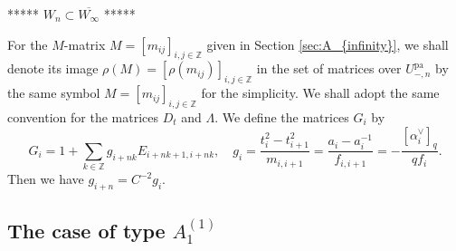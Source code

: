 \documentclass[12pt,twoside]{article}
\newcommand\av{\alpha^\vee}
\newcommand\pa{{\mathrm{pa}}}
\newcommand\Z{{\mathbb Z}} %
\theoremstyle{plain} %
\theoremstyle{definition} %
\theoremstyle{definition} %
\numberwithin{theorem}{section}
\numberwithin{equation}{section}
\numberwithin{figure}{section}
\numberwithin{table}{section}
\newcommand\secref[1]{Section \ref{#1}}
\begin{document}
***** $W_n\subset \overline{W_\infty}$ *****


For the $M$-matrix $M=[m_{ij}]_{i,j\in\Z}$ given in \secref{sec:A_{infinity}}, 
we shall denote its image $\rho(M)=[\rho(m_{ij})]_{i,j\in\Z}$ 
in the set of matrices over $U_{-,n}^\pa$
by the same symbol $M=[m_{ij}]_{i,j\in\Z}$ for the simplicity.
We shall adopt the same convention for the matrices $D_t$ and $\Lambda$.
We define the matrices $G_i$ by
\begin{equation*}
 G_i = 1 + \sum_{k\in\Z} g_{i+nk}E_{i+nk+1,i+nk}, \quad
 g_i 
 = \frac{t_i^2-t_{i+1}^2}{m_{i,i+1}}
 = \frac{a_i-a_i^{-1}}{f_{i,i+1}}
 = -\frac{[\av_i]_q}{qf_i}.
\end{equation*}
Then we have $g_{i+n}=C^{-2}g_i$.


\subsection{The case of type $A^{(1)}_{1}$}
\label{sec:A^{(1)}_1}

\end{document}
